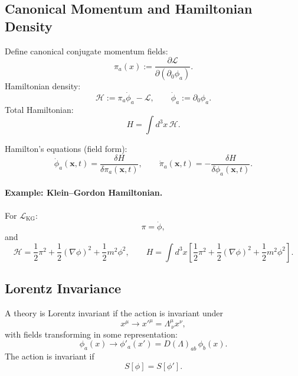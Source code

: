 \subsection{Canonical Momentum and Hamiltonian Density}
Define canonical conjugate momentum fields:
\begin{equation}
\pi_a(x) := \frac{\partial\mathcal{L}}{\partial(\partial_0\phi_a)}.
\end{equation}
Hamiltonian density:
\begin{equation}
\mathcal{H} := \pi_a \dot{\phi}_a - \mathcal{L},
\qquad \dot{\phi}_a:=\partial_0\phi_a.
\end{equation}
Total Hamiltonian:
\begin{equation}
H=\int d^3x\,\mathcal{H}.
\end{equation}

Hamilton's equations (field form):
\begin{equation}
\dot{\phi}_a(\mathbf{x},t)=\frac{\delta H}{\delta \pi_a(\mathbf{x},t)},
\qquad
\dot{\pi}_a(\mathbf{x},t)=-\frac{\delta H}{\delta \phi_a(\mathbf{x},t)}.
\end{equation}

\paragraph{Example: Klein--Gordon Hamiltonian.}
For $\mathcal{L}_{\mathrm{KG}}$:
\begin{equation}
\pi=\dot{\phi},
\end{equation}
and
\begin{equation}
\mathcal{H}
=\frac{1}{2}\pi^2+\frac{1}{2}(\nabla\phi)^2+\frac{1}{2}m^2\phi^2,
\qquad
H=\int d^3x\left[\frac{1}{2}\pi^2+\frac{1}{2}(\nabla\phi)^2+\frac{1}{2}m^2\phi^2\right].
\end{equation}

\subsection{Lorentz Invariance}
A theory is Lorentz invariant if the action is invariant under
\begin{equation}
x^\mu \to x'^\mu=\Lambda^\mu_{\ \nu}x^\nu,
\end{equation}
with fields transforming in some representation:
\begin{equation}
\phi_a(x)\to \phi'_a(x') = D(\Lambda)_{ab}\,\phi_b(x).
\end{equation}
The action is invariant if
\begin{equation}
S[\phi]=S[\phi'].
\end{equation}

